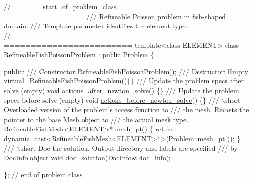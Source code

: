  
\begin{DoxyCodeInclude}
\textcolor{comment}{//======start\_of\_problem\_class========================================}
\textcolor{comment}{/// Refineable Poisson problem in fish-shaped domain.}
\textcolor{comment}{}\textcolor{comment}{/// Template parameter identifies the element type.}
\textcolor{comment}{}\textcolor{comment}{//====================================================================}
\textcolor{keyword}{template}<\textcolor{keyword}{class} ELEMENT>
\textcolor{keyword}{class }\hyperlink{classRefineableFishPoissonProblem}{RefineableFishPoissonProblem} : \textcolor{keyword}{public} Problem
\{

\textcolor{keyword}{public}:
\textcolor{comment}{}
\textcolor{comment}{ /// Constructor}
\textcolor{comment}{} \hyperlink{classRefineableFishPoissonProblem_a7a9c8258a867de6b3c8b9d00a7c965f1}{RefineableFishPoissonProblem}();
\textcolor{comment}{}
\textcolor{comment}{ /// Destructor: Empty}
\textcolor{comment}{} \textcolor{keyword}{virtual} \hyperlink{classRefineableFishPoissonProblem_a4a5e7c5f264364211ad641353933c222}{~RefineableFishPoissonProblem}()\{\}
\textcolor{comment}{}
\textcolor{comment}{ /// Update the problem specs after solve (empty)}
\textcolor{comment}{} \textcolor{keywordtype}{void} \hyperlink{classRefineableFishPoissonProblem_a7f6c356f7c8bd0130de957297e999f40}{actions\_after\_newton\_solve}() \{\}
\textcolor{comment}{}
\textcolor{comment}{ /// Update the problem specs before solve (empty)}
\textcolor{comment}{} \textcolor{keywordtype}{void} \hyperlink{classRefineableFishPoissonProblem_a58098181f3b88c2fc65f24fb15c1a529}{actions\_before\_newton\_solve}() \{\}
\textcolor{comment}{}
\textcolor{comment}{ /// \(\backslash\)short Overloaded version of the problem's access function to }
\textcolor{comment}{ /// the mesh. Recasts the pointer to the base Mesh object to }
\textcolor{comment}{ /// the actual mesh type.}
\textcolor{comment}{} RefineableFishMesh<ELEMENT>* \hyperlink{classRefineableFishPoissonProblem_a803c9050b07b35aba22f08a5a9e59f2c}{mesh\_pt}() 
  \{
   \textcolor{keywordflow}{return} \textcolor{keyword}{dynamic\_cast<}RefineableFishMesh<ELEMENT>*\textcolor{keyword}{>}(Problem::mesh\_pt());
  \}
\textcolor{comment}{}
\textcolor{comment}{ /// \(\backslash\)short Doc the solution. Output directory and labels are specified }
\textcolor{comment}{ /// by DocInfo object}
\textcolor{comment}{} \textcolor{keywordtype}{void} \hyperlink{classRefineableFishPoissonProblem_aeee1bf23216971b50b8822c45e62c48b}{doc\_solution}(DocInfo& doc\_info);

\}; \textcolor{comment}{// end of problem class}

\end{DoxyCodeInclude}




